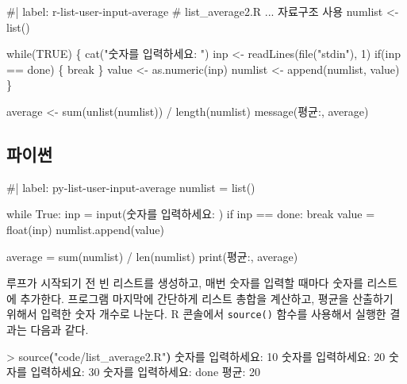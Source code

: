 \documentclass[
  letterpaper,
]{book}
\newenvironment{Shaded}{\begin{snugshade}}{\end{snugshade}}
\newcommand{\ExtensionTok}[1]{\textcolor[rgb]{0.00,0.23,0.31}{#1}}
\newcommand{\KeywordTok}[1]{\textcolor[rgb]{0.00,0.23,0.31}{\textbf{#1}}}
\newcommand{\NormalTok}[1]{\textcolor[rgb]{0.00,0.23,0.31}{#1}}
\newcommand{\OperatorTok}[1]{\textcolor[rgb]{0.37,0.37,0.37}{#1}}
\newcommand{\StringTok}[1]{\textcolor[rgb]{0.13,0.47,0.30}{#1}}
\begin{document}
\begin{Shaded}
\begin{Highlighting}[]
\NormalTok{\#| label: r{-}list{-}user{-}input{-}average}
\NormalTok{\# list\_average2.R ... 자료구조 사용 }
\NormalTok{numlist \textless{}{-} list()}

\NormalTok{while(TRUE) \{}
\NormalTok{  cat("숫자를 입력하세요: ")}
\NormalTok{  inp \textless{}{-} readLines(file("stdin"), 1)}
\NormalTok{  if(inp == \textquotesingle{}done\textquotesingle{}) \{}
\NormalTok{    break}
\NormalTok{  \}}
\NormalTok{  value \textless{}{-} as.numeric(inp)}
\NormalTok{  numlist \textless{}{-} append(numlist, value)}
\NormalTok{\}}

\NormalTok{average \textless{}{-} sum(unlist(numlist)) / length(numlist)}
\NormalTok{message(\textquotesingle{}평균:\textquotesingle{}, average)}
\end{Highlighting}
\end{Shaded}

\subsection{파이썬}

\begin{Shaded}
\begin{Highlighting}[]
\NormalTok{\#| label: py{-}list{-}user{-}input{-}average}
\NormalTok{numlist = list()}

\NormalTok{while True:}
\NormalTok{    inp = input(\textquotesingle{}숫자를 입력하세요: \textquotesingle{})}
\NormalTok{    if inp == \textquotesingle{}done\textquotesingle{}:}
\NormalTok{        break}
\NormalTok{    value = float(inp)}
\NormalTok{    numlist.append(value)}

\NormalTok{average = sum(numlist) / len(numlist)}
\NormalTok{print(\textquotesingle{}평균:\textquotesingle{}, average)}
\end{Highlighting}
\end{Shaded}

루프가 시작되기 전 빈 리스트를 생성하고, 매번 숫자를 입력할 때마다
숫자를 리스트에 추가한다. 프로그램 마지막에 간단하게 리스트 총합을
계산하고, 평균을 산출하기 위해서 입력한 숫자 개수로 나눈다. R 콘솔에서
\texttt{source()} 함수를 사용해서 실행한 결과는 다음과 같다.

\begin{Shaded}
\begin{Highlighting}[]
\OperatorTok{\textgreater{}}\NormalTok{ source}\KeywordTok{(}\StringTok{"code/list\_average2.R"}\KeywordTok{)}
\ExtensionTok{숫자를}\NormalTok{ 입력하세요: 10}
\ExtensionTok{숫자를}\NormalTok{ 입력하세요: 20}
\ExtensionTok{숫자를}\NormalTok{ 입력하세요: 30}
\ExtensionTok{숫자를}\NormalTok{ 입력하세요: done}
\ExtensionTok{평균:}\NormalTok{ 20}
\end{Highlighting}
\end{Shaded}
\end{document}

